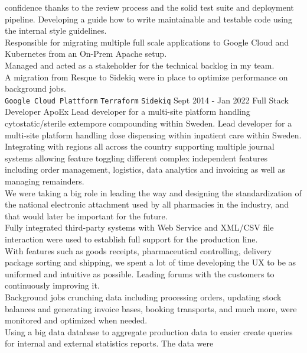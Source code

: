 \documentclass[9pt]{template} %
\begin{document}
\begin{entrylist}
{      confidence thanks to the review process and the solid test suite and
      deployment pipeline. Developing a guide how to write maintainable
      and testable code using the internal style guidelines.\\
      Responsible for migrating multiple full scale applications to Google Cloud
      and Kubernetes from an On-Prem Apache setup.\\
      Managed and acted as a stakeholder for the technical backlog in my team.\\
      A migration from Resque to Sidekiq were in place to optimize performance
      on background jobs.\\
      \texttt{Google Cloud Plattform}\slashsep
      \texttt{Terraform}\slashsep
      \texttt{Sidekiq}
    }
  \entry
    {Sept 2014 - Jan 2022}
    {Full Stack Developer}
    {ApoEx}
    {Lead developer for a multi-site platform handling cytostatic/sterile
      extempore compounding within Sweden.
      Lead developer for a multi-site platform handling dose dispensing within
      inpatient care within Sweden.\\
      Integrating with regions all across the country supporting multiple
      journal systems allowing feature toggling different complex independent
      features including order management, logistics, data analytics and
      invoicing as well as managing remainders.\\
      We were taking a big role in leading the way and designing the
      standardization of the national electronic attachment used by all
      pharmacies in the industry, and that would later be important for the
      future.\\
      Fully integrated third-party systems with Web Service and XML/CSV file
      interaction were used to establish full support for the
      production line.\\
      With features such as goods receipts, pharmaceutical controlling, delivery
      package sorting and shipping, we spent a lot of time developing the UX to
      be as uniformed and intuitive as possible. Leading forums with the
      customers to continuously improving it.\\
      Background jobs crunching data including processing orders, updating stock
      balances and generating invoice bases, booking transports, and much more,
      were monitored and optimized when needed.\\
      Using a big data database to aggregate production data to easier create
      queries for internal and external statistics reports. The data were
}
\end{entrylist}
\end{document}
